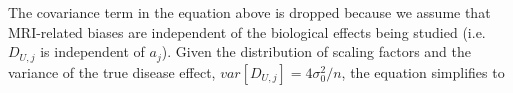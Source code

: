 The covariance term in the equation above is dropped because we assume that MRI-related biases are independent of the biological effects being studied (i.e. $D_{U,j}$ is independent of $a_j$). Given the distribution of scaling factors and the variance of the true disease effect, $var[D_{U,j}] = 4\sigma_0^2/n$, the equation simplifies to